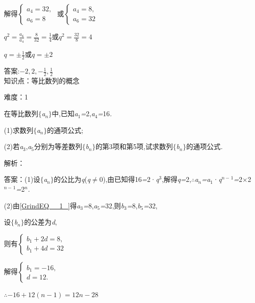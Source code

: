 \documentclass{article} %
\begin{document}
解得$\left\{
\begin{array}{l}
a_4=32, \\
a_6=8
\end{array}
\right.$ 或$\left\{
\begin{array}{l}
a_4=8, \\
a_6=32
\end{array}
\right.$

$q^2=\frac{a_6}{a_4}=\frac{8}{32}=\frac{1}{4}$或$q^2=\frac{32}{8}=4$

$q=\pm \frac{1}{2}$或$q=\pm 2$

 答案:$-2,2,-\frac{1}{2},\frac{1}{2}$ \\

知识点：等比数列的概念

难度：1

 在等比数列$\mathrm{\{}$\textit{a${}_{n}$}$\mathrm{\}}$中,已知\textit{a}${}_{1}$\textit{=}2,\textit{a}${}_{4}$\textit{=}16\textit{.}

 (1)求数列$\mathrm{\{}$\textit{a${}_{n}$}$\mathrm{\}}$的通项公式;

 (2)若\textit{a}${}_{3}$,\textit{a}${}_{5}$分别为等差数列$\mathrm{\{}$\textit{b${}_{n}$}$\mathrm{\}}$的第3项和第5项,试求数列$\mathrm{\{}$\textit{b${}_{n}$}$\mathrm{\}}$的通项公式\textit{.}

解析：

 答案：(1)设$\mathrm{\{}$\textit{a${}_{n}$}$\mathrm{\}}$的公比为\textit{q}(\textit{q}$\mathrm{\neq}$0),由已知得16\textit{=}2·\textit{q}${}^{3}$,解得\textit{q=}2,\textit{$\therefore$a${}_{n}$=a}${}_{1}$·\textit{q${}^{n-}$}${}^{1}$\textit{=}2\textit{$\times$}2\textit{${}^{n-}$}${}^{1}$\textit{=}2\textit{${}^{n}$.}

(2)由\eqref{GrindEQ__1_}得\textit{a}${}_{3}$\textit{=}8,\textit{a}${}_{5}$\textit{=}32,则\textit{b}${}_{3}$\textit{=}8,\textit{b}${}_{5}$\textit{=}32,

设$\mathrm{\{}$\textit{b${}_{n}$}$\mathrm{\}}$的公差为\textit{d},

则有$\left\{
\begin{array}{l}
b_1+2d=8, \\
b_1+4d=32
\end{array}
\right.$

解得$\left\{
\begin{array}{l}
b_1=-16, \\
d=12.
\end{array}
\right.$

$\therefore -16+12(n-1)=12n-28$ \\
\end{document}

